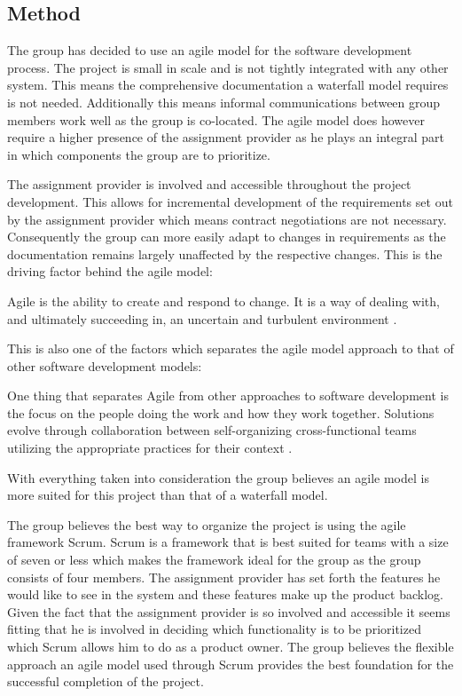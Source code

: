 \subsection{Method}
The group has decided to use an agile model for the software development process.
The project is small in scale and is not tightly integrated with any other system.
This means the comprehensive documentation a waterfall model requires is not needed.
Additionally this means informal communications between group members work well as the group is co-located.
The agile model does however require a higher presence of the assignment provider as he plays an integral part in which components the group are to prioritize.

The assignment provider is involved and accessible throughout the project development.
This allows for incremental development of the requirements set out by the assignment provider which means contract negotiations are not necessary.
Consequently the group can more easily adapt to changes in requirements as the documentation remains largely unaffected by the respective changes.
This is the driving factor behind the agile model:
\begin{displayquote}
Agile is the ability to create and respond to change.
It is a way of dealing with, and ultimately succeeding in, an uncertain and turbulent environment \cite{what-is-agile}.
\end{displayquote}
This is also one of the factors which separates the agile model approach to that of other software development models:

\begin{displayquote}
One thing that separates Agile from other approaches to software development is the focus on the people doing the work and how they work together.
Solutions evolve through collaboration between self-organizing cross-functional teams utilizing the appropriate practices for their context \cite{what-is-agile-software-development}.
\end{displayquote}
With everything taken into consideration the group believes an agile model is more suited for this project than that of a waterfall model.

The group believes the best way to organize the project is using the agile framework Scrum.
Scrum is a framework that is best suited for teams with a size of seven or less \cite{software-engineering-scrum-size} which makes the framework ideal for the group as the group consists of four members.
The assignment provider has set forth the features he would like to see in the system and these features make up the product backlog.
Given the fact that the assignment provider is so involved and accessible it seems fitting that he is involved in deciding which functionality is to be prioritized which Scrum allows him to do as a product owner.
The group believes the flexible approach an agile model used through Scrum provides the best foundation for the successful completion of the project.

